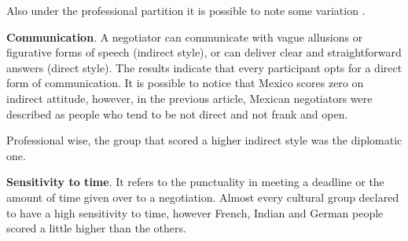 \documentclass[../main.tex]{subfiles}
\begin{document}
Also under the professional partition it is possible to note some variation \autocite[229]{salacuse}.

\vspace{0.3cm}
\begin{minipage}{\linewidth}
    \label{personalStylePerProfession}
\end{minipage}
\vspace{0.3cm}

\textbf{Communication}. A negotiator can communicate with vague allusions or figurative forms of speech (indirect style), or can deliver clear and straightforward answers (direct style). The results indicate that every participant opts for a direct form of communication. It is possible to notice that Mexico scores zero on indirect attitude, however, in the previous article, Mexican negotiators were described as people who tend to be not direct and not frank and open.

\vspace{0.3cm}
\begin{minipage}{\linewidth}
    \label{communicationStylePerCountry}
\end{minipage}
\vspace{0.3cm}

Professional wise, the group that scored a higher indirect style was the diplomatic one.

\textbf{Sensitivity to time}. It refers to the punctuality in meeting a deadline or the amount of time given over to a negotiation. Almost every cultural group declared to have a high sensitivity to time, however French, Indian and German people scored a little higher than the others.

\vspace{0.3cm}
\begin{minipage}{\linewidth}
    \label{sensitivityTimePerCountry}
\end{minipage}
\vspace{0.3cm}
\end{document}
